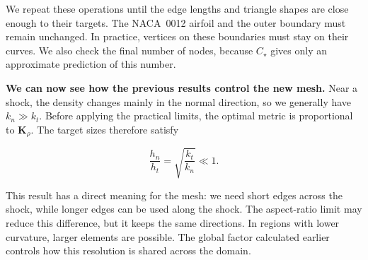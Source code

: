\documentclass[11pt,a4paper]{article}
\newcommand{\naca}{NACA~0012}
\begin{document}
\noindent We repeat these operations until the edge lengths
and triangle shapes are close enough to their targets.
The \naca{} airfoil and the outer boundary must remain
unchanged. In practice, vertices on these boundaries
must stay on their curves. We also check the final number
of nodes, because $C_\star$ gives only an approximate
prediction of this number.

\medskip

\noindent \textbf{We can now see how the previous results
control the new mesh.} Near a shock, the density changes
mainly in the normal direction, so we generally have
$k_n\gg k_t$. Before applying the practical limits,
the optimal metric is proportional to $\mathbf K_\rho$.
The target sizes therefore satisfy

\begin{equation}
    \label{eq:shock_target_aspect_ratio}
    \boxed{
    \frac{h_n}{h_t}
    =\sqrt{\frac{k_t}{k_n}}\ll1.
    }
\end{equation}

\noindent This result has a direct meaning for the mesh:
we need short edges across the shock, while longer edges
can be used along the shock. The aspect-ratio limit may
reduce this difference, but it keeps the same directions.
In regions with lower curvature, larger elements are
possible. The global factor calculated earlier controls
how this resolution is shared across the domain.


\begin{figure}[htbp]
\centering
{}

\label{fig:remaillage}
\end{figure}
\FloatBarrier
\end{document}
